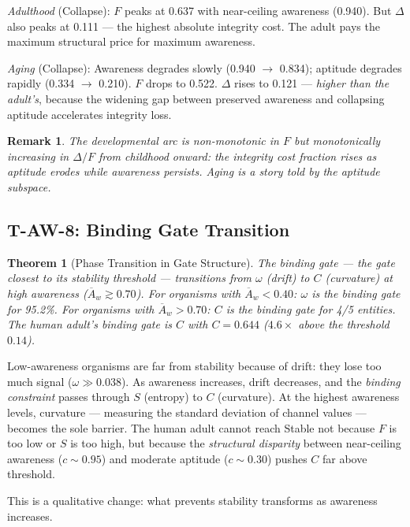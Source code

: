 \documentclass[
  aps,
  prd,
  twocolumn,
  superscriptaddress,
  nofootinbib,
  floatfix
]{revtex4-2}
\newtheorem{theorem}{Theorem}
\newtheorem{remark}{Remark}
\newcommand{\Aw}{\overline{A}_{\!w}}
\newcommand{\DeltaF}{\Delta\!/\!F}
\begin{document}
\emph{Adulthood} (Collapse): $F$ peaks at 0.637 with
near-ceiling awareness (0.940).  But $\Delta$ also peaks at
0.111 --- the highest absolute integrity cost.  The adult
pays the maximum structural price for maximum awareness.

\emph{Aging} (Collapse): Awareness degrades slowly (0.940 $\to$
0.834); aptitude degrades rapidly (0.334 $\to$ 0.210).  $F$
drops to 0.522.  $\Delta$ rises to 0.121 --- \emph{higher
than the adult's}, because the widening gap between preserved
awareness and collapsing aptitude accelerates integrity loss.

\begin{remark}
The developmental arc is non-monotonic in $F$ but
monotonically increasing in $\DeltaF$ from childhood onward:
the integrity cost fraction rises as aptitude erodes while
awareness persists.  Aging is a story told by the aptitude
subspace.
\end{remark}

\subsection{T-AW-8: Binding Gate Transition}

\begin{theorem}[Phase Transition in Gate Structure]%
\label{thm:TAW8}
The binding gate --- the gate closest to its stability
threshold --- transitions from $\omega$ (drift) to $C$
(curvature) at high awareness ($\Aw \gtrsim 0.70$).  For
organisms with $\Aw < 0.40$: $\omega$ is the binding gate
for 95.2\%.  For organisms with $\Aw > 0.70$: $C$ is the
binding gate for 4/5 entities.  The human adult's binding
gate is $C$ with $C = 0.644$ ($4.6\times$ above the
threshold~$0.14$).
\end{theorem}

Low-awareness organisms are far from stability because of
drift: they lose too much signal ($\omega \gg 0.038$).
As awareness increases, drift decreases, and the
\emph{binding constraint} passes through $S$ (entropy) to
$C$ (curvature).  At the highest awareness levels, curvature
--- measuring the standard deviation of channel values ---
becomes the sole barrier.  The human adult cannot reach
Stable not because $F$ is too low or $S$ is too high, but
because the \emph{structural disparity} between near-ceiling
awareness ($c \sim 0.95$) and moderate aptitude ($c \sim 0.30$)
pushes $C$ far above threshold.

This is a qualitative change: what prevents stability
transforms as awareness increases.
\end{document}
